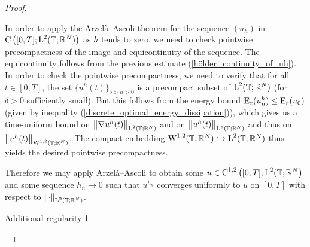 \begin{proof}
\begin{description}[wide=0pt]
		In order to apply the Arzelà--Ascoli theorem for the sequence $ (u_{ h 
		} ) $ in $ \operatorname{C} \left( [ 0 , T ] ; \operatorname{L}^{ 2 } ( \operatorname{\mathbb{T}} ; \mathbb{ R 
		}^{ N } ) \right) $ as $ h $ tends to zero, we need to check pointwise 
		precompactness 
		of the image and equicontinuity of the sequence. 
		The equicontinuity follows from the previous estimate (\ref{hölder_continuity_of_uh}).
		In order to check the pointwise precompactness, we need to verify that for all $ t \in [ 0 , T ] $, the set
		$ \{ u^{ h } ( t ) \}_{ \delta > h > 0 } $ is a precompact subset of $ \operatorname{L}^{ 2 } ( \operatorname{\mathbb{T}} ; \mathbb{ R }^{ N } ) $ (for $ \delta > 0 $ sufficiently small). 
		But this follows from the energy bound $ \operatorname{E}_{ \varepsilon } ( u_{ n }^{ h } ) \leq \operatorname{E}_{ \varepsilon } ( u_{ 0 } ) $ (given by inequality (\ref{discrete_optimal_energy_dissipation})), which gives us a time-uniform bound on $ \norm{ \nabla u^{ h }( t ) }_{\operatorname{L}^{ 2 }( \operatorname{\mathbb{T}}; \mathbb{ R }^{ N } ) } $ and on $ \norm{ u^{ h } ( t )}_{ \operatorname{L}^{ p } ( \operatorname{\mathbb{T}}; \mathbb{ R }^{ N } ) } $ and thus on $ \norm{ u^{ h } ( t )}_{ \operatorname{W}^{ 1 , 2 } ( \operatorname{\mathbb{T}}; \mathbb{ R }^{ N } ) } $. The compact embedding
		$ \operatorname{W}^{ 1 , 2 } ( \operatorname{\mathbb{T}} ; \mathbb{ R }^{ N } ) \hookrightarrow \operatorname{L}^{ 2 } ( \operatorname{\mathbb{T}}; \mathbb{ R }^{ N } ) $ thus yields the desired pointwise precompactness.
		
		Therefore we may apply Arzelà--Ascoli to obtain some $ u \in \operatorname{C}^{ 1 , 2 } \left( [ 0, T ] ; \operatorname{L}^{ 2 } ( \operatorname{\mathbb{T}} ; \mathbb{ R }^{ N } \right) $ and some  sequence $ h_{ n } \to 0 $ such that
		$ u^{ h_{ n } } $ converges uniformly to $ u $ on $ [ 0 , T ] $ with respect to $ \norm{ \cdot }_{ \operatorname{L}^{ 2 } ( \operatorname{\mathbb{T}} ; \mathbb{ R }^{ N } ) } $.
		
		\item[Step 6:] Additional regularity 1
		

\end{description}
\end{proof}
